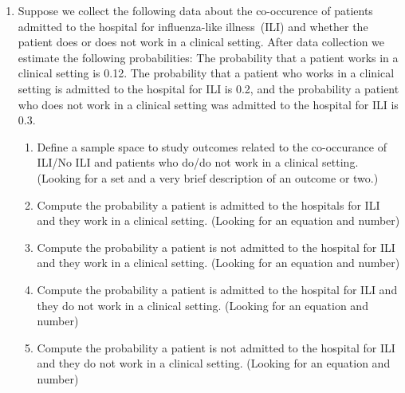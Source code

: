 \documentclass[krantz1,ChapterTOCs]{krantz}
\begin{document}
\begin{enumerate}
   \item Suppose we collect the following data about the co-occurence of patients admitted to the hospital for influenza-like illness~(ILI) and whether the patient does or does not work in a clinical setting. 
   After data collection we estimate the following probabilities: The probability that a patient works in a clinical setting is 0.12. The probability that a patient who works in a clinical setting is admitted to the hospital for ILI is 0.2, and the probability a patient who does not work in a clinical setting was admitted to the hospital for ILI is 0.3. 
   \begin{enumerate}
       \item Define a sample space to study outcomes related to the co-occurance of ILI/No ILI and patients who do/do not work in a clinical setting. (Looking for a set and a very brief description of an outcome or two.) 
       \item Compute the probability a patient is admitted to the hospitals for ILI and they work in a clinical setting. (Looking for an equation and number)
       \item Compute the probability a patient is not admitted to the hospital for ILI and they work in a clinical setting. (Looking for an equation and number)
       \item Compute the probability a patient is admitted to the hospital for ILI and they do not work in a clinical setting. (Looking for an equation and number)
       \item Compute the probability a patient is not admitted to the hospital for ILI and they do not work in a clinical setting. (Looking for an equation and number)
   \end{enumerate}
   

\end{enumerate}
\end{document}
